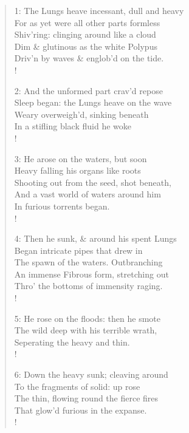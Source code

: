 \documentclass[9pt]{extarticle}
\begin{document}
\begin{verse}
\begin{altverse} 
		
		1: The Lungs heave incessant, dull and heavy\\
		For as yet were all other parts formless\\
		Shiv’ring: clinging around like a cloud\\
		Dim \& glutinous as the white Polypus\\
		Driv’n by waves \& englob’d on the tide.\\!
		
		2: And the unformed part crav’d repose\\
		Sleep began: the Lungs heave on the wave\\
		Weary overweigh’d, sinking beneath\\
		In a stifling black fluid he woke\\!
		
		3: He arose on the waters, but soon\\
		Heavy falling his organs like roots\\
		Shooting out from the seed, shot beneath,\\
		And a vast world of waters around him\\
		In furious torrents began.\\!
		
		4: Then he sunk, \& around his spent Lungs\\
		Began intricate pipes that drew in\\
		The spawn of the waters. Outbranching\\
		An immense Fibrous form, stretching out\\
		Thro' the bottoms of immensity raging.\\!
		
		5: He rose on the floods: then he smote\\
		The wild deep with his terrible wrath,\\
		Seperating the heavy and thin.\\!
		
		6: Down the heavy sunk; cleaving around\\
		To the fragments of solid: up rose\\
		The thin, flowing round the fierce fires\\
		That glow’d furious in the expanse.\\!
		
\end{altverse}
\end{verse}	
\end{document}
